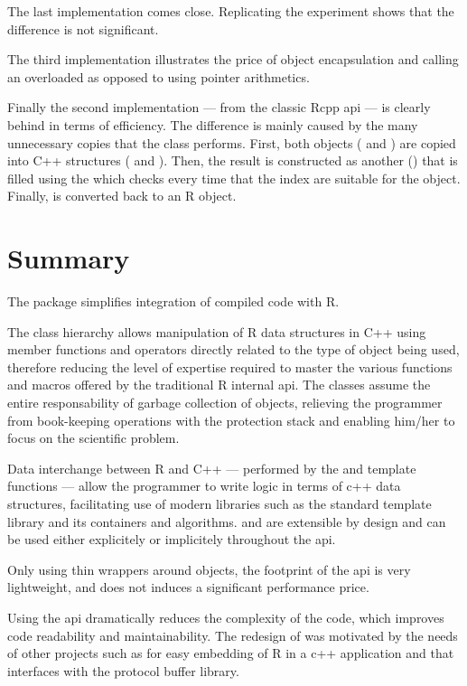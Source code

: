 The last implementation comes close. Replicating the experiment
shows that the difference is not significant. 

The third implementation illustrates the price of object encapsulation
and calling an overloaded  as opposed to using 
pointer arithmetics.

Finally the second implementation --- from the classic Rcpp api --- 
is clearly behind in terms of efficiency. The difference is mainly 
caused by the many unnecessary copies that the 
class performs. First, both objects ( and )
are copied into C++ structures ( and ). 
Then, the result is constructed as another 
() that is filled using the  which checks
every time that the index are suitable for the object. Finally, 
is converted back to an R object. 

\section{Summary}

The  package simplifies integration of compiled code
with R. 

The class hierarchy allows manipulation of R data structures in C++ 
using member functions and operators directly related to the type
of object being used, therefore reducing the level of expertise
required to master the various functions and macros offered by the
traditional R internal api. The classes assume the entire 
responsability of garbage collection of objects, relieving the 
programmer from book-keeping operations with the protection stack 
and enabling him/her to focus on the scientific problem. 

Data interchange between R and C++ --- performed by the 
 and  template functions --- allow the programmer
to write logic in terms of c++ data structures, facilitating use
of modern libraries such as the standard template library and its 
containers and algorithms.  and  are extensible
by design and can be used either explicitely or implicitely throughout 
the api. 

Only using thin wrappers around  objects, 
the footprint of the  api is very lightweight, and does not 
induces a significant performance price. 

Using the  api dramatically reduces the complexity 
of the code, which improves code readability and maintainability.
The redesign of  was motivated by the needs of other 
projects such as  for easy embedding 
of R in a c++ application and  \citep{cran:rprotobuf} 
that interfaces with the protocol buffer library. 



\address{Dirk Eddelbuettel\\
  Debian Project\\
  Chicago, IL\\
  USA}\\

\address{Romain Fran\c{c}ois\\
  Professionnal R Enthusiast\\
  3 rue Emile Bonnet, 34 090 Montpellier\\
  FRANCE}\\

